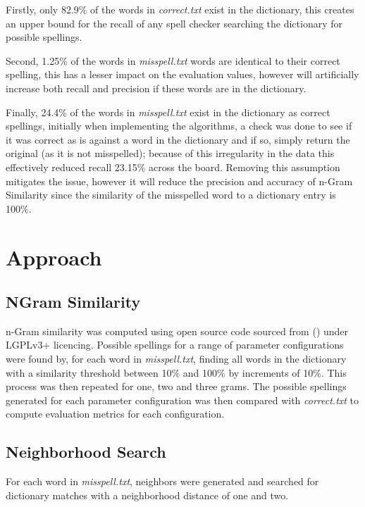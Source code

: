 \documentclass[twocolumn]{article}
\begin{document}
    Firstly, only 82.9\% of the words in \textit{correct.txt} exist in the dictionary, this creates an upper bound for the recall of
    any spell checker searching the dictionary for possible spellings.

    Second, 1.25\% of the words in \textit{misspell.txt} words are identical to their correct spelling, this has a
    lesser impact on the evaluation values, however will artificially increase both recall and precision if these words
    are in the dictionary.

    Finally, 24.4\% of the words in \textit{misspell.txt} exist in the dictionary as correct spellings, initially
    when implementing the algorithms, a check was done to see if it was correct as is against a word in the dictionary
    and if so, simply return the original (as it is not misspelled);
    because of this irregularity in the data this effectively reduced recall 23.15\% across the board.
    Removing this assumption mitigates the issue, however it will reduce the precision and accuracy of n-Gram Similarity
    since the similarity of the misspelled word to a dictionary entry is 100\%.

    \section{Approach}

        \subsection{NGram Similarity}
    n-Gram similarity was computed using open source code sourced from (\cite{NGRAM}) under LGPLv3+ licencing.
    Possible spellings for a range of parameter configurations were found by, for each word in \textit{misspell.txt},
    finding all words in the dictionary with a similarity threshold between 10\% and 100\% by increments of 10\%.
    This process was then repeated for one, two and three grams.
    The possible spellings generated for each parameter configuration was then compared with \textit{correct.txt} to
    compute evaluation metrics for each configuration.

        \subsection{Neighborhood Search}
    For each word in \textit{misspell.txt}, neighbors were generated and searched for dictionary matches with a
    neighborhood distance of one and two.
\end{document}
